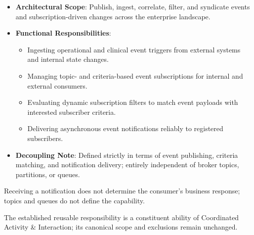 
\begin{itemize}

\item
\textbf{Architectural Scope}: Publish, ingest, correlate, filter, and syndicate events and subscription-driven changes across the enterprise landscape.



\item
\textbf{Functional Responsibilities}:


\begin{itemize}

\item
Ingesting operational and clinical event triggers from external systems and internal state changes.



\item
Managing topic- and criteria-based event subscriptions for internal and external consumers.



\item
Evaluating dynamic subscription filters to match event payloads with interested subscriber criteria.



\item
Delivering asynchronous event notifications reliably to registered subscribers.



\end{itemize}


\item
\textbf{Decoupling Note}: Defined strictly in terms of event publishing, criteria matching, and notification delivery; entirely independent of broker topics, partitions, or queues.



\end{itemize}


Receiving a notification does not determine the consumer's business response; topics and queues do not define the capability.



The established reusable responsibility is a constituent ability of Coordinated Activity \& Interaction; its canonical scope and exclusions remain unchanged.


